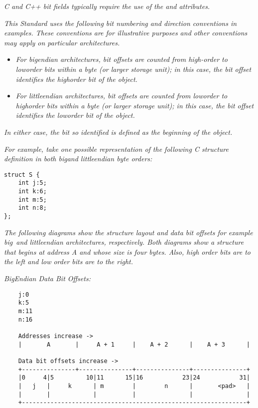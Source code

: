 \textit{C and C++ bit fields typically require the use of the
 and  attributes.}

\textit{This Standard uses the following bit numbering and direction
conventions in examples. These conventions are for illustrative
purposes and other conventions may apply on particular
architectures.}


\begin{itemize}
\item \textit{For big\dash endian architectures, bit offsets are
counted from high-order to low\dash order bits within a byte (or
larger storage unit); in this case, the bit offset identifies
the high\dash order bit of the object.}

\item \textit{For little\dash endian architectures, bit offsets are
counted from low\dash order to high\dash order bits within a byte (or
larger storage unit); in this case, the bit offset identifies
the low\dash order bit of the object.}
\end{itemize}


\textit{In either case, the bit so identified is defined as the beginning of the object.}

\textit{For example, take one possible representation of the following C structure definition in both big\dash and little\dash endian byte orders:}

\begin{lstlisting}
struct S {
    int j:5;
    int k:6;
    int m:5;
    int n:8;
};
\end{lstlisting}

\textit{The following diagrams show the structure layout
and data bit offsets for example big\dash\   and little\dash endian
architectures, respectively. Both diagrams show a structure
that begins at address A and whose size is four bytes. Also,
high order bits are to the left and low order bits are to
the right.}

\textit{Big\dash Endian Data Bit Offsets:}

\begin{verbatim}
    j:0
    k:5
    m:11
    n:16

    Addresses increase ->
    |       A       |     A + 1     |    A + 2      |    A + 3      | 

    Data bit offsets increase ->
    +---------------+---------------+---------------+---------------+
    |0     4|5         10|11      15|16           23|24           31|
    |   j   |     k      | m        |        n      |       <pad>   |
    |       |            |          |               |               | 
    +---------------------------------------------------------------+ 
\end{verbatim}


